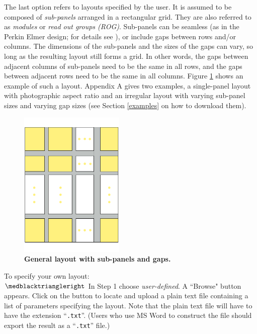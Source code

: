 \documentclass[11pt,a4paper]{article}
\begin{document}
The last option refers to layouts specified by the user. It is assumed to be composed of \emph{sub-panels} arranged in a rectangular grid. They are also referred to as \emph{modules} or \emph{read out groups (ROG)}. Sub-panels can be seamless (as in the Perkin Elmer design; for details see \cite{manualXRD1621}), or include gaps between rows and/or columns. The dimensions of the sub-panels and the sizes of the gaps can vary, so long as the resulting layout still forms a grid. In other words, the gaps between adjacent columns of sub-panels need to be the same in all rows, and the gaps between adjacent rows need to be the same in all columns. Figure \ref{fig_layout_nopar} shows an example of such a layout. Appendix A gives two examples, a single-panel layout with photographic aspect ratio and an irregular layout with varying sub-panel sizes and varying gap sizes (see Section \ref{examples} on how to download them).
 
\begin{figure}[htbp]
\begin{center}
\includegraphics[width=5cm, angle=90]{layoutDrawingNoPar.pdf}
\caption
{
{\bfseries 
General layout with sub-panels and gaps.}
}
\label{fig_layout_nopar}
\end{center}
\end{figure}

To specify your own layout:
\\
$\medblacktriangleright$ In Step 1 choose \emph{user-defined}.  A ``Browse" button appears. Click on the button
to locate and upload a plain text file containing a list of parameters specifying the layout. Note that the plain text file will have to have the extension ``\texttt{.txt}''. (Users who use MS Word to construct the file should export the result as a ``\texttt{.txt}'' file.) 
\end{document}
